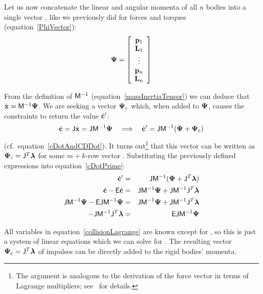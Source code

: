 Let us now concatenate the linear and angular momenta of all $n$ bodies into a single vector
\ve{\Psi}, like we previously did for forces and torques (equation~\ref{PhiVector}):
\begin{equation} \label{PsiVector}
\ve{\Psi} = \left[\begin{array}{c}
    \ve{p}_1 \\ \ve{L}_1 \\ \vdots \\ \ve{p}_n \\ \ve{L}_n \end{array}\right]
\end{equation}

From the definition of $\mathsf{M}^{-1}$ (equation~\ref{massInertiaTensor}) we can deduce that
$\dot{\ve{x}} = \m{M}^{-1}\ve{\Psi}$. We are seeking a vector $\ve{\Psi}_c$ which, when
added to $\ve{\Psi}$, causes the constraints to return the value $\dot{\ve{c}}'$:
\begin{equation} \label{cDotPrime}
\dot{\ve{c}} = \m{J}\dot{\ve{x}} = \m{J}\m{M}^{-1}\ve{\Psi} \quad\Longrightarrow\quad
    \dot{\ve{c}}' = \m{J}\m{M}^{-1}(\ve{\Psi} + \ve{\Psi}_c)
\end{equation}
(cf.\ equation~\ref{cDotAndCDDot}).
It turns out\footnote{The argument is analogous to the derivation of the force vector in terms of
Lagrange multipliers; see~\cite{BaraffWitkin:97} for details.} that this vector can be written as
$\ve{\Psi}_c = \m{J}^T\ve{\lambda}$ for some $m+k$-row vector \ve{\lambda}. Substituting the
previously defined expressions into equation~\ref{cDotPrime}:
\begin{eqnarray}
\dot{\ve{c}}' &=& \m{J}\m{M}^{-1}(\ve{\Psi} + \m{J}^T\ve{\lambda}) \nonumber\\
\dot{\ve{c}} - \m{E}\dot{\ve{c}} &=&
    \m{J}\m{M}^{-1}\ve{\Psi} + \m{J}\m{M}^{-1}\m{J}^T\ve{\lambda} \nonumber\\
\m{J}\m{M}^{-1}\ve{\Psi} - \m{E}\m{J}\m{M}^{-1}\ve{\Psi} & = &
    \m{J}\m{M}^{-1}\ve{\Psi} + \m{J}\m{M}^{-1}\m{J}^T\ve{\lambda} \nonumber\\
-\m{J}\m{M}^{-1}\m{J}^T\ve{\lambda} &=& \m{E}\m{J}\m{M}^{-1}\ve{\Psi} \label{collisionLagrange}
\end{eqnarray}

All variables in equation~\ref{collisionLagrange} are known except for \ve{\lambda}, so this is
just a system of linear equations which we can solve for \ve{\lambda}. The resulting vector
$\ve{\Psi}_c = \m{J}^T\ve{\lambda}$ of impulses can be directly added to the rigid bodies' momenta.

